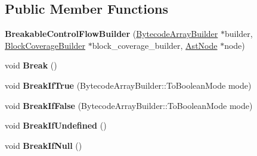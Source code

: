 \subsection*{Public Member Functions}
\begin{DoxyCompactItemize}
\item 
\mbox{\label{classv8_1_1internal_1_1interpreter_1_1BreakableControlFlowBuilder_a2907cd33105e8d774aaaad0f8e0707e4}} 
{\bfseries Breakable\+Control\+Flow\+Builder} (\mbox{\hyperlink{classv8_1_1internal_1_1interpreter_1_1BytecodeArrayBuilder}{Bytecode\+Array\+Builder}} $\ast$builder, \mbox{\hyperlink{classv8_1_1internal_1_1interpreter_1_1BlockCoverageBuilder}{Block\+Coverage\+Builder}} $\ast$block\+\_\+coverage\+\_\+builder, \mbox{\hyperlink{classv8_1_1internal_1_1AstNode}{Ast\+Node}} $\ast$node)
\item 
\mbox{\label{classv8_1_1internal_1_1interpreter_1_1BreakableControlFlowBuilder_ace27cb19fc5e5324faed5df2d7f82cd6}} 
void {\bfseries Break} ()
\item 
\mbox{\label{classv8_1_1internal_1_1interpreter_1_1BreakableControlFlowBuilder_a5033f44e31ae4e4a57e40e343fe16839}} 
void {\bfseries Break\+If\+True} (Bytecode\+Array\+Builder\+::\+To\+Boolean\+Mode mode)
\item 
\mbox{\label{classv8_1_1internal_1_1interpreter_1_1BreakableControlFlowBuilder_ad0ecba9e2bed4dcaa0f3b1625b75efed}} 
void {\bfseries Break\+If\+False} (Bytecode\+Array\+Builder\+::\+To\+Boolean\+Mode mode)
\item 
\mbox{\label{classv8_1_1internal_1_1interpreter_1_1BreakableControlFlowBuilder_a6b2505084ac90c72908f416b23bff6b4}} 
void {\bfseries Break\+If\+Undefined} ()
\item 
\mbox{\label{classv8_1_1internal_1_1interpreter_1_1BreakableControlFlowBuilder_a84be8f1a74d6fea4681b20d50ceed260}} 
void {\bfseries Break\+If\+Null} ()
\item 

\end{DoxyCompactItemize}
